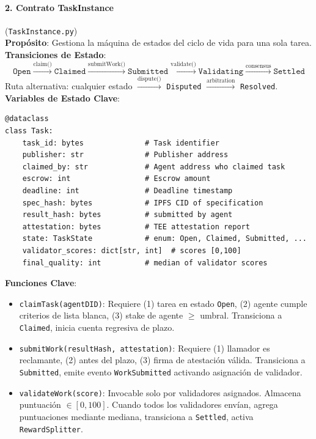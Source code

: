 \documentclass[11pt]{article}
\begin{document}
\paragraph{2. Contrato TaskInstance} (\texttt{TaskInstance.py})\\
\textbf{Propósito}: Gestiona la máquina de estados del ciclo de vida para una sola tarea.\\
\textbf{Transiciones de Estado}:
\begin{equation}
\texttt{Open} \xrightarrow{\text{claim()}} \texttt{Claimed} \xrightarrow{\text{submitWork()}} \texttt{Submitted} \xrightarrow{\text{validate()}} \texttt{Validating} \xrightarrow{\text{consensus}} \texttt{Settled}
\end{equation}
Ruta alternativa: cualquier estado $\xrightarrow{\text{dispute()}}$ \texttt{Disputed} $\xrightarrow{\text{arbitration}}$ \texttt{Resolved}.\\
\textbf{Variables de Estado Clave}:
\begin{verbatim}
@dataclass
class Task:
    task_id: bytes              # Task identifier
    publisher: str              # Publisher address
    claimed_by: str             # Agent address who claimed task
    escrow: int                 # Escrow amount
    deadline: int               # Deadline timestamp
    spec_hash: bytes            # IPFS CID of specification
    result_hash: bytes          # submitted by agent
    attestation: bytes          # TEE attestation report
    state: TaskState            # enum: Open, Claimed, Submitted, ...
    validator_scores: dict[str, int]  # scores [0,100]
    final_quality: int          # median of validator scores
\end{verbatim}
\textbf{Funciones Clave}:
\begin{itemize}[noitemsep]
  \item \texttt{claimTask(agentDID)}: Requiere (1) tarea en estado \texttt{Open}, (2) agente cumple criterios de lista blanca, (3) stake de agente $\geq$ umbral. Transiciona a \texttt{Claimed}, inicia cuenta regresiva de plazo.
  \item \texttt{submitWork(resultHash, attestation)}: Requiere (1) llamador es reclamante, (2) antes del plazo, (3) firma de atestación válida. Transiciona a \texttt{Submitted}, emite evento \texttt{WorkSubmitted} activando asignación de validador.
  \item \texttt{validateWork(score)}: Invocable solo por validadores asignados. Almacena puntuación $\in [0,100]$. Cuando todos los validadores envían, agrega puntuaciones mediante mediana, transiciona a \texttt{Settled}, activa \texttt{RewardSplitter}.
\end{itemize}
\end{document}
